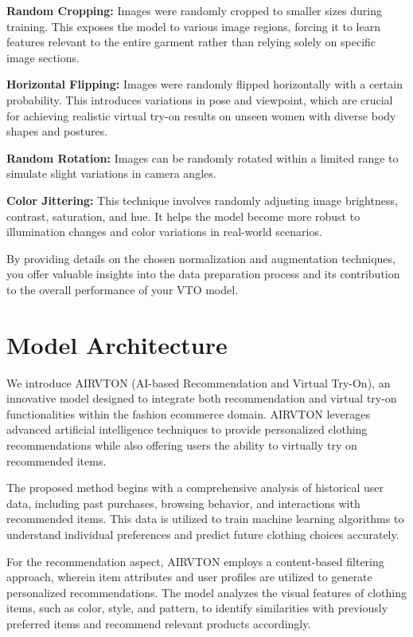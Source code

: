 \textbf{Random Cropping:} Images were randomly cropped to smaller sizes during training. This exposes the model to various image regions, forcing it to learn features relevant to the entire garment rather than relying solely on specific image sections.

\textbf{Horizontal Flipping:} Images were randomly flipped horizontally with a certain probability. This introduces variations in pose and viewpoint, which are crucial for achieving realistic virtual try-on results on unseen women with diverse body shapes and postures.

\textbf{Random Rotation:} Images can be randomly rotated within a limited range to simulate slight variations in camera angles.

\textbf{Color Jittering:} This technique involves randomly adjusting image brightness, contrast, saturation, and hue. It helps the model become more robust to illumination changes and color variations in real-world scenarios.

By providing details on the chosen normalization and augmentation techniques, you offer valuable insights into the data preparation process and its contribution to the overall performance of your VTO model.

\section{Model Architecture}
We introduce AIRVTON (AI-based Recommendation and Virtual Try-On), an innovative model designed to integrate both recommendation and virtual try-on functionalities within the fashion ecommerce domain. AIRVTON leverages advanced artificial intelligence techniques to provide personalized clothing recommendations while also offering users the ability to virtually try on recommended items.

	The proposed method begins with a comprehensive analysis of historical user data, including past purchases, browsing behavior, and interactions with recommended items. This data is utilized to train machine learning algorithms to understand individual preferences and predict future clothing choices accurately.

	For the recommendation aspect, AIRVTON employs a content-based filtering approach, wherein item attributes and user profiles are utilized to generate personalized recommendations. The model analyzes the visual features of clothing items, such as color, style, and pattern, to identify similarities with previously preferred items and recommend relevant products accordingly.

